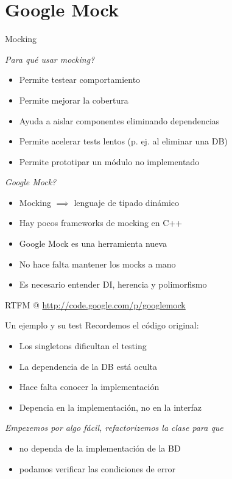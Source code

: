 \section{Google Mock}


\begin{frame}[t]{Mocking}
\begin{center}
\end{center}

 {
	\textit{ \textquestiondown Para qu\'e usar mocking? }
	\bigskip
	\begin{itemize}
		\item Permite testear comportamiento
		\item Permite mejorar la cobertura
		\item Ayuda a aislar componentes eliminando dependencias
		\item Permite acelerar tests lentos (p. ej. al eliminar una DB)
		\item Permite prototipar un m\'odulo no implementado
	\end{itemize}
}

 {
	\textit{ \textquestiondown Google Mock? }
	\bigskip
	\begin{itemize}
		\item Mocking $\implies$ lenguaje de tipado din\'amico
		\item Hay pocos frameworks de mocking en C++
		\item Google Mock es una herramienta nueva
		\item No hace falta mantener los mocks a mano
		\item Es necesario entender DI, herencia y polimorfismo
	\end{itemize}
}

\bigskip
RTFM @ \url{http://code.google.com/p/googlemock}
\end{frame}

\begin{frame}{Un ejemplo y su test}
 Recordemos el c\'odigo original: \hyperlink{OriginalExample}{}
\begin{itemize}
	\item Los singletons dificultan el testing
	\item La dependencia de la DB est\'a oculta
	\item Hace falta conocer la implementaci\'on
	\item Depencia en la implementaci\'on, no en la interfaz
\end{itemize}
\bigskip
\textit{Empezemos por algo f\'acil, refactorizemos la clase para que}
\begin{itemize}
	\item no dependa de la implementaci\'on de la BD
	\item podamos verificar las condiciones de error
\end{itemize}
\end{frame}


